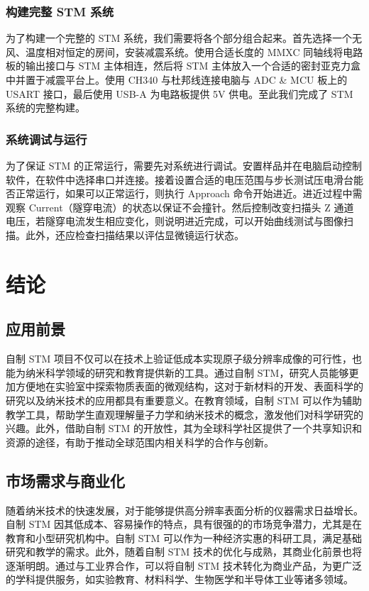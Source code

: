 \documentclass{article}
\begin{document}
\subsubsection{构建完整 STM 系统}
为了构建一个完整的 STM 系统，我们需要将各个部分组合起来。首先选择一个无风、温度相对恒定的房间，安装减震系统。使用合适长度的 MMXC 同轴线将电路板的输出接口与 STM 主体相连，然后将 STM 主体放入一个合适的密封亚克力盒中并置于减震平台上。使用 CH340 与杜邦线连接电脑与 ADC \& MCU 板上的 USART 接口，最后使用 USB-A 为电路板提供 5V 供电。至此我们完成了 STM 系统的完整构建。

\subsubsection{系统调试与运行}
为了保证 STM 的正常运行，需要先对系统进行调试。安置样品并在电脑启动控制软件，在软件中选择串口并连接。接着设置合适的电压范围与步长测试压电滑台能否正常运行，如果可以正常运行，则执行 Approach 命令开始进近。进近过程中需观察 Current（隧穿电流）的状态以保证不会撞针。然后控制改变扫描头 Z 通道电压，若隧穿电流发生相应变化，则说明进近完成，可以开始曲线测试与图像扫描。此外，还应检查扫描结果以评估显微镜运行状态。

\clearpage
\setcounter{section}{5}	 	%
\setcounter{subsection}{0}	%

\section*{结论}
\subsection{应用前景}
自制 STM 项目不仅可以在技术上验证低成本实现原子级分辨率成像的可行性，也能为纳米科学领域的研究和教育提供新的工具。通过自制 STM，研究人员能够更加方便地在实验室中探索物质表面的微观结构，这对于新材料的开发、表面科学的研究以及纳米技术的应用都具有重要意义。在教育领域，自制 STM 可以作为辅助教学工具，帮助学生直观理解量子力学和纳米技术的概念，激发他们对科学研究的兴趣。此外，借助自制 STM 的开放性，其为全球科学社区提供了一个共享知识和资源的途径，有助于推动全球范围内相关科学的合作与创新。

\subsection{市场需求与商业化}
随着纳米技术的快速发展，对于能够提供高分辨率表面分析的仪器需求日益增长。自制 STM 因其低成本、容易操作的特点，具有很强的的市场竞争潜力，尤其是在教育和小型研究机构中。自制 STM 可以作为一种经济实惠的科研工具，满足基础研究和教学的需求。此外，随着自制 STM 技术的优化与成熟，其商业化前景也将逐渐明朗。通过与工业界合作，可以将自制 STM 技术转化为商业产品，为更广泛的学科提供服务，如实验教育、材料科学、生物医学和半导体工业等诸多领域。
\end{document}
